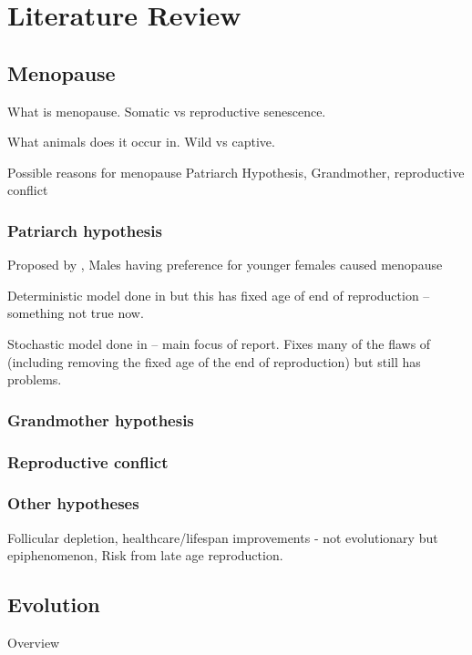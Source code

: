 \documentclass[authoryearcitations]{UoYCSproject}
\begin{document}
\chapter{Literature Review}
\label{cha:Literature Review}

\section{Menopause}
What is menopause. Somatic vs reproductive senescence. 

What animals does it occur in. Wild vs captive.

Possible reasons for menopause Patriarch Hypothesis, Grandmother, reproductive conflict

\subsection{Patriarch hypothesis}
Proposed by \cite{patriarchHypothesis2000} , Males having preference for younger females caused menopause

Deterministic model done in \cite{whyMenMatter2007} but this has fixed age of end of reproduction -- something not true now.

Stochastic model done in \cite{mateChoice2013} -- main focus of report. Fixes many of the flaws of \cite{whyMenMatter2007} (including removing the fixed age of the end of reproduction) but still has problems.


\subsection{Grandmother hypothesis}

\subsection{Reproductive conflict}

\subsection{Other hypotheses}
Follicular depletion, healthcare/lifespan improvements - not evolutionary but epiphenomenon, Risk from late age reproduction.

\section{Evolution}
Overview \cite{origin1859}
\end{document}
